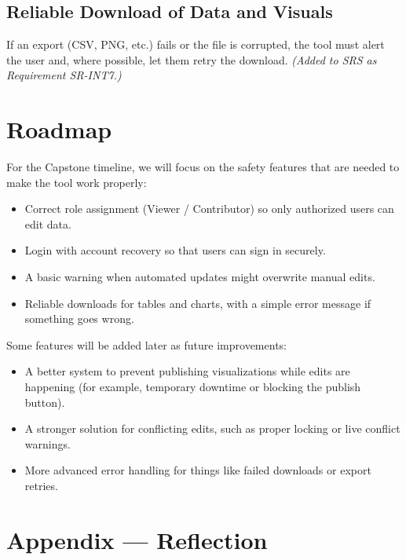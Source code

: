 \documentclass{article}
\begin{document}
\subsection*{Reliable Download of Data and Visuals}
If an export (CSV, PNG, etc.) fails or the file is corrupted, the tool must alert the user and, where possible, let them retry the download. \textit{(Added to SRS as Requirement SR-INT7.)}

\section{Roadmap}

For the Capstone timeline, we will focus on the safety features that are needed to make the tool work properly:

\begin{itemize}
    \item Correct role assignment (Viewer / Contributor) so only authorized users can edit data.
    \item Login with account recovery so that users can sign in securely.
    \item A basic warning when automated updates might overwrite manual edits.
    \item Reliable downloads for tables and charts, with a simple error message if something goes wrong.
\end{itemize}

Some features will be added later as future improvements:

\begin{itemize}
    \item A better system to prevent publishing visualizations while edits are happening (for example, temporary downtime or blocking the publish button).
    \item A stronger solution for conflicting edits, such as proper locking or live conflict warnings.
    \item More advanced error handling for things like failed downloads or export retries.
\end{itemize}


\newpage{}

\section*{Appendix --- Reflection}



\end{document}
